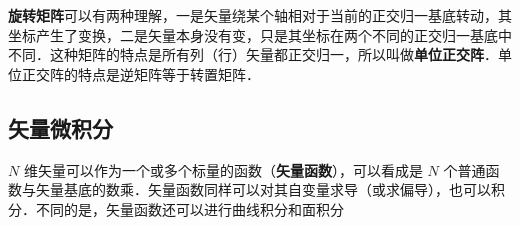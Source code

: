 \textbf{旋转矩阵}可以有两种理解，一是矢量绕某个轴相对于当前的正交归一基底转动，其坐标产生了变换，二是矢量本身没有变，只是其坐标在两个不同的正交归一基底中不同．这种矩阵的特点是所有列（行）矢量都正交归一，所以叫做\textbf{单位正交阵}．单位正交阵的特点是逆矩阵等于转置矩阵．


\subsection{矢量微积分}
$N$ 维矢量可以作为一个或多个标量的函数（\textbf{矢量函数}），可以看成是 $N$ 个普通函数与矢量基底的数乘．矢量函数同样可以对其自变量求导（或求偏导），也可以积分．不同的是，矢量函数还可以进行曲线积分和面积分 %




